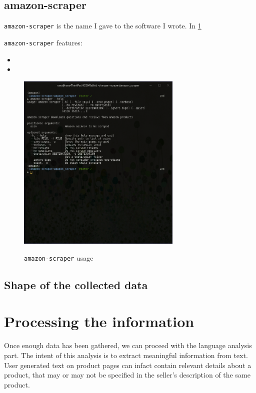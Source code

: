 \documentclass[LaM,binding=0.6cm]{sapthesis}
\begin{document}
\section{amazon-scraper}
\texttt{amazon-scraper} is the name I gave to the software I wrote. In \ref{fig:amazon-scraper}

\texttt{amazon-scraper} features:
\begin{itemize}
	\item 
	\item
\end{itemize}

\begin{figure}
\centering
\includegraphics[width=0.7\textwidth]{pictures/1.png}\\[3ex]
\caption{\texttt{amazon-scraper} usage}
\label{fig:amazon-scraper}
\end{figure}

\section{Shape of the collected data}

\chapter{Processing the information}

Once enough data has been gathered, we can proceed with the language analysis part.
The intent of this analysis is to extract meaningful information from text. User generated text on product pages can infact contain relevant details about a product, that may or may not be specified in the seller's description of the same product. 
\end{document}
